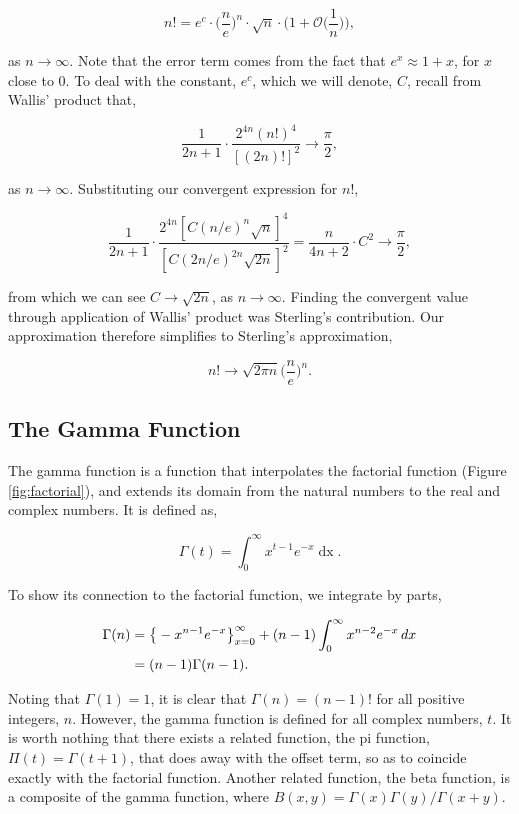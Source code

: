 \documentclass[11pt]{amsart}
\begin{document}
$$n! = e^c\cdot\Bigg(\frac{n}{e}\Bigg)^n \cdot \sqrt{n} \cdot \Bigg(1 + \mathcal{O}\Bigg(\frac{1}{n}\Bigg)\Bigg),$$

as $n \to \infty$. Note that the error term comes from the fact that $e^x \approx 1 + x$, for $x$ close to 0. To deal with the constant, $e^c$, which we will denote, $C$, recall from Wallis' product that,

$$\frac{1}{2n + 1} \cdot \frac{2^{4n}(n!)^4}{[(2n)!]^2} \to \frac{\pi}{2},$$

as $n \to \infty$. Substituting our convergent expression for $n!$,

$$\frac{1}{2n + 1} \cdot \frac{2^{4n}[C(n/e)^n\sqrt{n}]^4}{[C(2n/e)^{2n}\sqrt{2n}]^2} = \frac{n}{4n + 2}\cdot C^2 \to \frac{\pi}{2},$$

from which we can see $C \to \sqrt{2n}$, as $n \to \infty$. Finding the convergent value through application of Wallis' product was Sterling's contribution. Our approximation therefore simplifies to Sterling's approximation,

$$n! \to \sqrt{2\pi n}\Bigg(\frac{n}{e}\Bigg)^n.$$

\subsection{The Gamma Function}

The gamma function is a function that interpolates the factorial function (Figure \ref{fig:factorial}), and extends its domain from the natural numbers to the real and complex numbers. It is defined as,

$$\Gamma(t) = \int_0^{\infty} x^{t-1}e^{-x}\mathop{dx}.$$

To show its connection to the factorial function, we integrate by parts,

\begin{align}
\Gamma(n) &= \big\{-x^{n-1}e^{-x}\big\}_{x=0}^{\infty} + (n - 1)\int_0^{\infty} x^{n-2}e^{-x}\mathop{dx} \notag \\
&= (n-1)\Gamma(n-1).\notag
\end{align}

Noting that $\Gamma(1) = 1$, it is clear that $\Gamma(n) = (n - 1)!$ for all positive integers, $n$. However, the gamma function is defined for all complex numbers, $t$. It is worth nothing that there exists a related function, the pi function, $\Pi(t) = \Gamma(t + 1)$, that does away with the offset term, so as to coincide exactly with the factorial function. Another related function, the beta function, is a composite of the gamma function, where $B(x, y) = \Gamma(x)\Gamma(y)/\Gamma(x+y)$.
\end{document}

